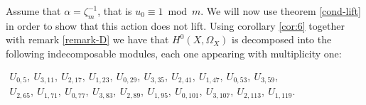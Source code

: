 \documentclass[11pt,letterpaper]{amsart}
\theoremstyle{definition}
\renewcommand{\mod}{\bmod}
\begin{document}
 Assume that $\alpha=\zeta_m^{-1}$, that is $u_0\equiv 1 \mod m$. We will now use theorem \ref{cond-lift} in order to show that this  action does not lift.
Using corollary \ref{cor:6} together with remark \ref{remark-D} we have that $H^0(X,\Omega_X)$ is decomposed into the following indecomposable modules, each one appearing with multiplicity one:

$
\begin{array}{c}
U_{ 0 , 5 },\ 
U_{ 3 , 11 },\ 
U_{ 2 , 17 },\ 
U_{ 1 , 23 }, \
U_{ 0 , 29 },\ 
U_{ 3 , 35 },\ 
U_{ 2 , 41 },\ 
U_{ 1 , 47 },\ 
U_{ 0 , 53 },\ 
U_{ 3 , 59 },\ 
\\
U_{ 2 , 65 },\ 
U_{ 1 , 71 },\ 
U_{ 0 , 77 },\ 
U_{ 3 , 83 },\ 
U_{ 2 , 89 },\ 
U_{ 1 , 95 },\ 
U_{ 0 , 101 },\ 
U_{ 3 , 107 },\ 
U_{ 2 , 113 },\ 
U_{ 1 , 119 }.
\end{array} 
$
\\
\end{document}
